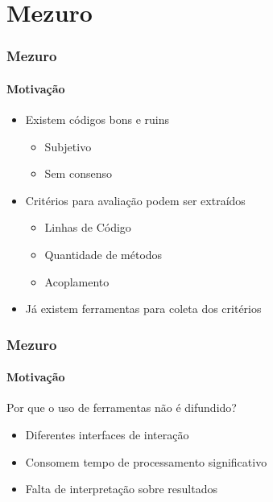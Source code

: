 \documentclass{beamer}
\begin{document}
\section{Mezuro}
\begin{frame}
  \frametitle{Mezuro}
  \framesubtitle{Motivação}
    \begin{itemize}
      \item Existem códigos bons e ruins
        \begin{itemize}
          \item Subjetivo
          \vspace{.25cm}
          \item Sem consenso
        \end{itemize}
      \vspace{.5cm}
      \item Critérios para avaliação podem ser extraídos
        \begin{itemize}
          \item Linhas de Código
          \vspace{.25cm}
          \item Quantidade de métodos
          \vspace{.25cm}
          \item Acoplamento
        \end{itemize}
      \vspace{.5cm}
      \item Já existem ferramentas para coleta dos critérios
    \end{itemize}
\end{frame}

\begin{frame}
  \frametitle{Mezuro}
  \framesubtitle{Motivação}

  Por que o uso de ferramentas não é difundido?

  \begin{itemize}
    \item Diferentes interfaces de interação
    \vspace{.5cm}
    \item Consomem tempo de processamento significativo
    \vspace{.5cm}
    \item Falta de interpretação sobre resultados
  \end{itemize}
\end{frame}
\end{document}
